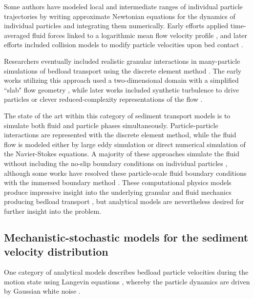 Some authors have modeled local and intermediate ranges of individual particle trajectories by writing approximate Newtonian equations for the dynamics of individual particles and integrating them numerically. Early efforts applied time-averaged fluid forces linked to a logarithmic mean flow velocity profile \citep{Yalin1963,VanRijn1984}, and later efforts included collision models to modify particle velocities upon bed contact \citep{Wiberg1985,Sekine1992,Nino1998}.

Researchers eventually included realistic granular interactions in many-particle simulations of bedload transport using the discrete element method \citep[e.g.][]{Cundall1979, Wachs2019}.
The early works utilizing this approach used a two-dimensional domain with a simplified ``slab" flow geometry \citep{Haff1993,Gotoh1997}, while later works included synthetic turbulence to drive particles \citep{Schmeeckle2003,Maurin2015} or clever reduced-complexity representations of the flow \citep{Clark2015,Clark2017}.

The state of the art within this category of sediment transport models is to simulate both fluid and particle phases simultaneously.
Particle-particle interactions are represented with the discrete element method, while the fluid flow is modeled either by large eddy simulation or direct numerical simulation of the Navier-Stokes equations.
A majority of these approaches simulate the fluid without including the no-slip boundary conditions on individual particles \citep[e.g.][]{Vowinckel2014,Schmeeckle2014,Gonzalez2017}, although some works have resolved these particle-scale fluid boundary conditions with the immersed boundary method \citep[e.g.][]{Ji2013, Ji2014, Elghannay2017, Yousefi2020}.
These computational physics models produce impressive insight into the underlying granular and fluid mechanics producing bedload transport \citep{Frey2011}, but analytical models are nevertheless desired for further insight into the problem.

\subsection{Mechanistic-stochastic models for the sediment velocity distribution}
\label{sec:langevin}

One category of analytical models describes bedload particle velocities during the motion state using Langevin equations \citep{Ancey2014,Fan2014}, whereby the particle dynamics are driven by Gaussian white noise \citep{Kubo1978}.

